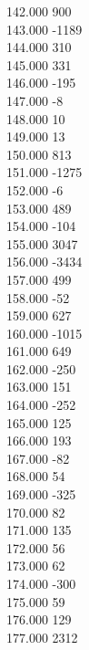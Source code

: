 { 142.000	900 \\
 143.000	-1189 \\
 144.000	310 \\
 145.000	331 \\
 146.000	-195 \\
 147.000	-8 \\
 148.000	10 \\
 149.000	13 \\
 150.000	813 \\
 151.000	-1275 \\
 152.000	-6 \\
 153.000	489 \\
 154.000	-104 \\
 155.000	3047 \\
 156.000	-3434 \\
 157.000	499 \\
 158.000	-52 \\
 159.000	627 \\
 160.000	-1015 \\
 161.000	649 \\
 162.000	-250 \\
 163.000	151 \\
 164.000	-252 \\
 165.000	125 \\
 166.000	193 \\
 167.000	-82 \\
 168.000	54 \\
 169.000	-325 \\
 170.000	82 \\
 171.000	135 \\
 172.000	56 \\
 173.000	62 \\
 174.000	-300 \\
 175.000	59 \\
 176.000	129 \\
 177.000	2312 \\
}
